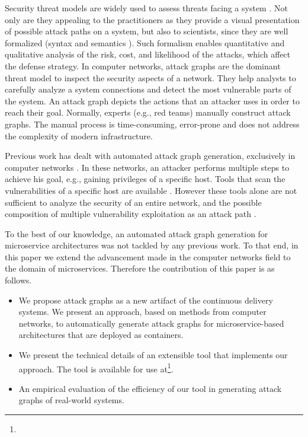 Security threat models are widely used to assess threats facing a system \cite{kordy2014dag}. Not only are they appealing to the practitioners as they provide a visual presentation of possible attack paths on a system, but also to scientists, since they are well formalized (syntax and semantics \cite{mauw2005foundations,jha2002two}). Such formalism enables quantitative and qualitative analysis of the risk, cost, and likelihood of the attacks, which affect the defense strategy. In computer networks, attack graphs \cite{sheyner2002automated,ou2006scalable} are the dominant threat model to inspect the security aspects of a network. They help analysts to carefully analyze a system connections and detect the most vulnerable parts of the system. An attack graph depicts the actions that an attacker uses in order to reach their goal. Normally, experts (e.g., red teams) manually construct attack graphs. The manual process is time-consuming, error-prone and does not address the complexity of modern infrastructure. %


Previous work has dealt with automated  attack graph generation, exclusively in computer networks \cite{ingols2006practical, sheyner2002automated,  sheyner2003tools, ou2006scalable}. In these networks, an attacker performs multiple steps to achieve his goal, e.g., gaining privileges of a specific host. Tools that scan the vulnerabilities of a specific host are available \cite{farmer1990cops}. However these tools alone are not sufficient to analyze the security of an entire network, and the possible composition of multiple vulnerability exploitation as an attack path \cite{sheyner2002automated}. 

To the best of our knowledge, an automated attack graph generation for microservice architectures was not tackled by any previous work. To that end, in this paper we extend the advancement made in the computer networks field to the domain of microservices. Therefore the contribution of this paper is as follows.
\begin{itemize}
\item We propose attack graphs as a new artifact of the continuous delivery systems. We present an approach, based on methods from computer networks, to automatically generate attack graphs for microservice-based architectures that are deployed as containers.   
\item We present the technical details of an extensible tool that implements our approach. The tool is available for use at\footnote{}.
\item An empirical evaluation of the efficiency of our tool in generating attack graphs of real-world systems.
\end{itemize}







